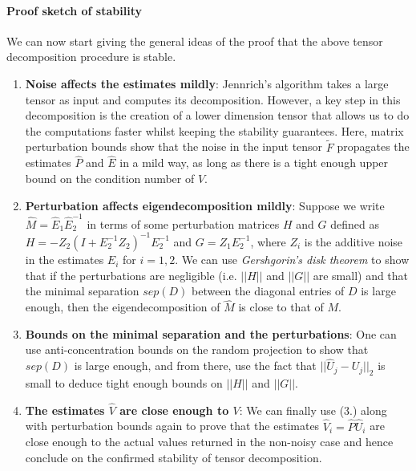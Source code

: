 \paragraph{Proof sketch of stability} We can now start giving the general ideas of the proof that the above tensor decomposition procedure is stable.
\begin{enumerate}
    \item {\bf Noise affects the estimates mildly}: Jennrich's algorithm takes a large tensor as input and computes its decomposition. However, a key step in this decomposition is the creation of a lower dimension tensor that allows us to do the computations faster whilst keeping the stability guarantees. Here, matrix perturbation bounds show that the noise in the input tensor $\widetilde{F}$ propagates the estimates $\widehat{P}$ and $\widehat{E}$ in a mild way, as long as there is a tight enough upper bound on the condition number of $V$.
    \item {\bf Perturbation affects eigendecomposition mildly}: Suppose we write $\widehat{M}=\widehat{E}_1\widehat{E}_2^{-1}$ in terms of some perturbation matrices $H$ and $G$ defined as $H=-Z_2(I+E_2^{-1}Z_2)^{-1}E_2^{-1}$ and $G=Z_1E_2^{-1}$, where $Z_i$ is the additive noise in the estimates $\widehat{E}_i$ for $i=1,2$. We can use \textit{Gershgorin's disk theorem} to show that if the perturbations are negligible (i.e. $||H||$ and $||G||$ are small) and that the minimal separation $sep(D)$ between the diagonal entries of $D$ is large enough, then the eigendecomposition of $\widehat{M}$ is close to that of $M$.
    \item {\bf Bounds on the minimal separation and the perturbations}: One can use anti-concentration bounds on the random projection to show that $sep(D)$ is large enough, and from there, use the fact that $||\widehat{U}_j-U_j||_2$ is small to deduce tight enough bounds on $||H||$ and $||G||$.
    \item {\bf The estimates $\widehat{V}$ are close enough to $V$}: We can finally use (3.) along with perturbation bounds again to prove that the estimates $\widehat{V}_i=\widehat{P}\widehat{U}_i$ are close enough to the actual values returned in the non-noisy case and hence conclude on the confirmed stability of tensor decomposition.
\end{enumerate}
